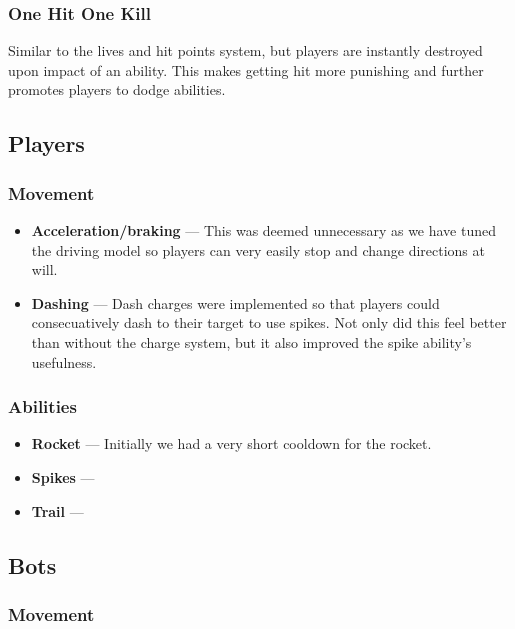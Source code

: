 \documentclass{article}
\theoremstyle{definition}
\begin{document}
\subsubsection{One Hit One Kill}

Similar to the lives and hit points system, but players are instantly destroyed
upon impact of an ability. This makes getting hit more punishing and further
promotes players to dodge abilities.

\subsection{Players}

\subsubsection{Movement}

\begin{itemize}
  \item \textbf{Acceleration/braking} --- This was deemed unnecessary as we have tuned the driving model so players can very easily stop and change directions at will.
  \item \textbf{Dashing} --- Dash charges were implemented so that players could consecuatively dash to their target to use spikes. Not only did this feel better than without the charge system, but it also improved the spike ability's usefulness.
\end{itemize}

\subsubsection{Abilities}

\begin{itemize}
  \item \textbf{Rocket} --- Initially we had a very short cooldown for the rocket.
  \item \textbf{Spikes} ---
  \item \textbf{Trail} ---
\end{itemize}

\subsection{Bots}

\subsubsection{Movement}
\end{document}
